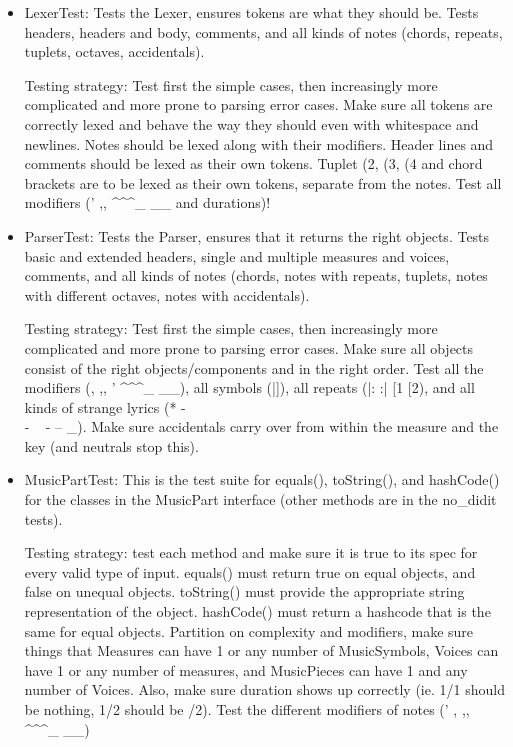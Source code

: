 \documentclass[12pt]{book}
\begin{document}
\begin{itemize}
\item LexerTest:  Tests the Lexer, ensures tokens are what they should be. Tests headers, headers and body, comments, and all kinds of notes (chords, repeats, tuplets, octaves, accidentals).
 
Testing strategy: Test first the simple cases, then increasingly more complicated and more prone to parsing error cases. Make sure all tokens are correctly lexed and behave the way they should even with whitespace and newlines. Notes should be lexed along with their modifiers. Header lines and comments should be lexed as their own tokens. Tuplet (2, (3, (4 and chord brackets are to be lexed as their own tokens, separate from the notes. Test all modifiers (' ,, \textasciicircum \textasciicircum\textasciicircum \_ \_\_ and durations)!

\item ParserTest: Tests the Parser, ensures that it returns the right objects. Tests basic and extended headers, single and multiple measures and voices, comments, and all kinds of notes (chords, notes with repeats, tuplets, notes with different octaves, notes with accidentals).
 
Testing strategy: Test first the simple cases, then increasingly more complicated and more prone to parsing error cases. Make sure all objects consist of the right objects/components and in the right order. Test all the modifiers (, ,, ' \textasciicircum \textasciicircum\textasciicircum \_ \_\_), all symbols (|]), all repeats (|: :| [1 [2), and all kinds of strange lyrics (* - \\- ~ - -- \_). Make sure accidentals carry over from within the measure and the key (and neutrals stop this).

\item MusicPartTest:  This is the test suite for equals(), toString(), and hashCode() for the classes in the MusicPart interface (other methods are in the no\_didit tests).

Testing strategy: test each method and make sure it is true to its spec for every valid type of input. equals() must return true on equal objects, and false on unequal objects. toString() must provide the appropriate string representation of the object. hashCode() must return a hashcode that is the same for equal objects.
Partition on complexity and modifiers, make sure things that Measures can have 1 or any number of MusicSymbols, Voices can have 1 or any number of measures, and MusicPieces can have 1 and any number of Voices. Also, make sure duration shows up correctly (ie. 1/1 should be nothing, 1/2 should be /2). Test the different modifiers of notes (' , ,, \textasciicircum \textasciicircum\textasciicircum \_ \_\_)


\end{itemize}
\end{document}
